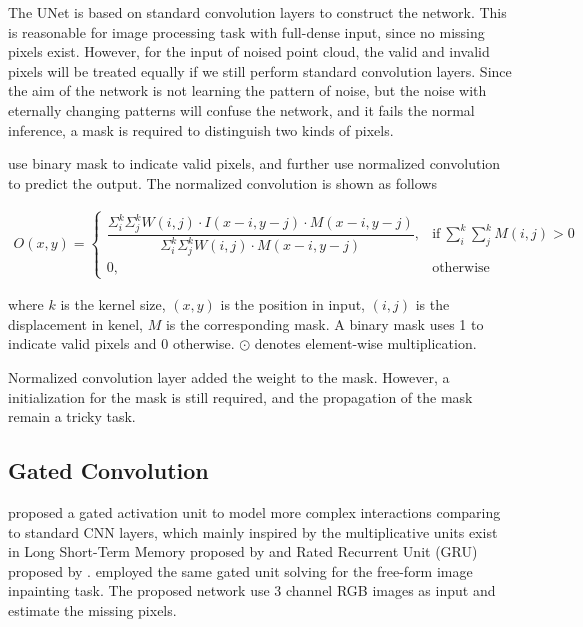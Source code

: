 \documentclass[border=15pt, multi, tikz]{article}
\begin{document}
The UNet is based on standard convolution layers to construct the network. This is reasonable for image processing task with full-dense input, since no missing pixels exist. 
However, for the input of noised point cloud, the valid and invalid pixels will be treated equally if we still perform standard convolution layers. Since the aim of the network is not learning the pattern of noise, but the noise with eternally changing patterns will confuse the network, and it fails the normal inference, a mask is required to distinguish two kinds of pixels. 

\cite{pncnn0} use binary mask to indicate valid pixels, and further use normalized convolution to predict the output. The normalized convolution is shown as follows

\begin{equation}
	\begin{array}{rrclcl}
		O(x,y) = 
		\begin{cases}
			\dfrac{\Sigma_i^k\Sigma_j^k W(i,j) \cdot I(x-i,y-j) \cdot M(x-i,y-j)}{\Sigma_i^k\Sigma_j^k W(i,j) \cdot M(x-i,y-j)}, & \text{if}\ \sum_{i}^k\sum_{j}^k M(i,j)>0 \\
			0, & \text{otherwise}
		\end{cases}
	\end{array}
\end{equation}

where $ k $ is the kernel size, $ (x,y) $ is the position in input, $ (i,j) $ is the displacement in kenel, $ M $ is the corresponding mask. A binary mask uses 1 to indicate valid pixels and 0 otherwise. $ \odot $ denotes element-wise multiplication.

Normalized convolution layer added the weight to the mask. However, a initialization for the mask is still required, and the propagation of the mask remain a tricky task. 

\subsection{Gated Convolution}

\cite{gated_activation} proposed a gated activation unit to model more complex interactions comparing to standard CNN layers, which mainly inspired by the multiplicative units exist in Long Short-Term Memory proposed by \cite{lstm} and Rated Recurrent Unit (GRU) proposed by \cite{gru}. 
\cite{gconv} employed the same gated unit solving for the free-form image inpainting task. The proposed network use 3 channel RGB images as input and estimate the missing pixels. 
\end{document}
